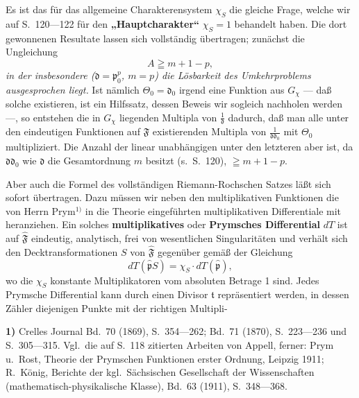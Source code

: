 \documentclass{article}
\begin{document}
Es ist das für das allgemeine Charakterensystem $\chi_S$ die gleiche Frage, welche wir auf S.~120---122 für den \textbf{„Hauptcharakter“} $\chi_S = 1$ behandelt haben. Die dort gewonnenen Resultate lassen sich vollständig übertragen; zunächst die Ungleichung
\[ A \geqq m + 1 - p, \]
\emph{in der insbesondere ($\mathfrak{d} = \mathfrak{p}_0^p$, $m = p$) die Lösbarkeit des Umkehrproblems ausgesprochen liegt.} Ist nämlich $\Theta_0 = \mathfrak{d}_0$ irgend eine Funktion aus $G_\chi$ --- daß solche existieren, ist ein Hilfssatz, dessen Beweis wir sogleich nachholen werden ---, so entstehen die in $G_\chi$ liegenden Multipla von $\frac{1}{\mathfrak{d}}$ dadurch, daß man alle unter den eindeutigen Funktionen auf $\mathfrak{F}$ existierenden Multipla von $\frac{1}{\mathfrak{d}\mathfrak{d}_0}$ mit $\Theta_0$ multipliziert. Die Anzahl der linear unabhängigen unter den letzteren aber ist, da $\mathfrak{d}\mathfrak{d}_0$ wie $\mathfrak{d}$ die Gesamtordnung $m$ besitzt (s.\ S.~120), $\geqq m + 1 - p$.

Aber auch die Formel des vollständigen Riemann-Rochschen Satzes läßt sich sofort übertragen. Dazu müssen wir neben den multiplikativen Funktionen die von Herrn Prym${}^{1)}$ in die Theorie eingeführten multiplikativen Differentiale mit heranziehen. Ein solches \textbf{multiplikatives} oder \textbf{Prymsches Differential} $dT$ ist auf $\hat{\mathfrak{F}}$ eindeutig, analytisch, frei von wesentlichen Singularitäten und verhält sich den Decktransformationen $S$ von $\hat{\mathfrak{F}}$ gegenüber gemäß der Gleichung
\[ dT(\hat{\mathfrak{p}}S) = \chi_S \cdot dT(\hat{\mathfrak{p}}), \]
wo die $\chi_S$ konstante Multiplikatoren vom absoluten Betrage 1 sind. Jedes Prymsche Differential kann durch einen Divisor $\mathfrak{t}$ repräsentiert werden, in dessen Zähler diejenigen Punkte mit der richtigen Multipli-

\textbf{1)} Crelles Journal Bd.~70 (1869), S.~354---262; Bd.~71 (1870), S.~223---236 und S.~305---315. Vgl.\ die auf S.~118 zitierten Arbeiten von Appell, ferner: Prym u.\ Rost, Theorie der Prymschen Funktionen erster Ordnung, Leipzig 1911; R.~König, Berichte der kgl.\ Sächsischen Gesellschaft der Wissenschaften (mathematisch-physikalische Klasse), Bd.~63 (1911), S.~348---368.
\end{document}
